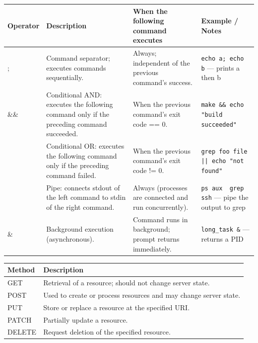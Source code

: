 \documentclass{article}
\begin{document}
\begin{description}
\begin{center}
        \begin{tabular}{p{1.6cm} p{6cm} p{5cm} p{3.2cm}}
          \hline
            Operator & \textbf{Description} & \textbf{When the following command executes} & \textbf{Example / Notes} \\
          \hline
          	; & Command separator; executes commands sequentially. & Always; independent of the previous command's success. & \texttt{echo a; echo b} — prints a then b \\
          	\&\& & Conditional AND: executes the following command only if the preceding command succeeded. & When the previous command's exit code == 0. & \texttt{make \&\& echo "build succeeded"} \\
          	\textbar \textbar & Conditional OR: executes the following command only if the preceding command failed. & When the previous command's exit code != 0. & \texttt{grep foo file || echo "not found"} \\
          	\textbar & Pipe: connects stdout of the left command to stdin of the right command. & Always (processes are connected and run concurrently). & \texttt{ps aux \textbar\ grep ssh} — pipe the output to grep \\
          	\& & Background execution (asynchronous). & Command runs in background; prompt returns immediately. & \texttt{long\_task \&} — returns a PID \\
          \hline
        \end{tabular}
      \end{center}

     \begin{center}

      \label{tab:http-methods}
      \vspace{0.5em}

      \begin{tabular}{p{2.2cm} p{7.0cm}}
        \hline
        	\textbf{Method} & \textbf{Description} \\
        \hline
        	GET & Retrieval of a resource; should not change server state. \\
        	POST & Used to create or process resources and may change server state. \\
        	PUT & Store or replace a resource at the specified URI. \\
        	PATCH & Partially update a resource. \\
        	DELETE & Request deletion of the specified resource. \\
        \hline
      \end{tabular}
    \end{center}


\end{description}
\end{document}
